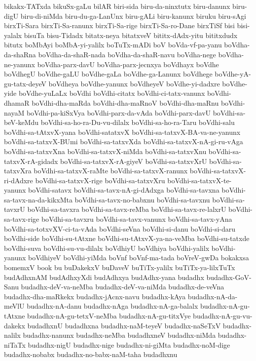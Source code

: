 {bikakx-TATxda
bikuSx-gaLu
bilAR
biri-sida
biru-da-ninxtutx
biru-danunx
biru-digU
biru-di-niMda
biru-du-ga-LanUnx
biru-gALi
biru-kanunx
biruku
biru-sAgi
birxTi-Sara
birxTi-Sa-ranunx
birxTi-Sa-rige
birxTi-Sa-ro-Dane
birxTiSf
bisi
bisi-yalalx
bisuTa
bisu-Tidadx
bitatx-neya
bitatxveV
bititx-dAdx-yitu
bititxdudx
bitutx
boMbAyi
boMbA-yi-yalilx
boTuTx-mADi
boV
boVda-vf-pa-yanu
boVdha-da-shaRna
boVdha-da-shaR-nada
boVdha-da-shaR-navu
boVdha-nege
boVdha-ne-yanunx
boVdha-parx-davU
boVdha-parx-jecnxya
boVdhayx
boVdhe
boVdhegU
boVdhe-gaLU
boVdhe-gaLa
boVdhe-ga-Lanunx
boVdhege
boVdhe-yA-gu-tatx-deyeV
boVdheya
boVdhe-yanunx
boVdheyeV
boVdhe-yi-dadxre
boVdhe-yide
boVdhe-yuLaLx
boVdhi
boVdhi-citatx
boVdhi-ci-tatx-vanunx
boVdhi-dhamaR
boVdhi-dha-maRda
boVdhi-dha-maRnoV
boVdhi-dha-maRnu
boVdhi-nayaM
boVdhi-pa-kiSxVya
boVdhi-parx-da-vAda
boVdhi-parx-davU
boVdhi-sa-beV-keMdu
boVdhi-sa-ho-ra-Du-vu-dilalx
boVdhi-sa-ho-ra-Taru
boVdhi-salu
boVdhi-sa-tAtxvX-yana
boVdhi-satatxvX
boVdhi-sa-tatxvX-BA-va-ne-yanunx
boVdhi-sa-tatxvX-BUmi
boVdhi-sa-tatxvXda
boVdhi-sa-tatxvX-nA-gi-ru-vAga
boVdhi-sa-tatxvXna
boVdhi-sa-tatxvX-niMda
boVdhi-sa-tatxvXnu
boVdhi-sa-tatxvX-rA-gidadx
boVdhi-sa-tatxvX-rA-giyeV
boVdhi-sa-tatxvXrU
boVdhi-sa-tatxvXra
boVdhi-sa-tatxvX-raMte
boVdhi-sa-tatxvX-ranunx
boVdhi-sa-tatxvX-ri-dAdxre
boVdhi-sa-tatxvX-rige
boVdhi-sa-tatxvXru
boVdhi-sa-tatxvX-te-yanunx
boVdhi-satavx
boVdhi-sa-tavx-nA-gi-dAdxga
boVdhi-sa-tavxna
boVdhi-sa-tavx-na-da-kikxMta
boVdhi-sa-tavx-no-babxnu
boVdhi-sa-tavxnu
boVdhi-sa-tavxrU
boVdhi-sa-tavxra
boVdhi-sa-tavx-reMba
boVdhi-sa-tavx-re-lalxrU
boVdhi-sa-tavx-rige
boVdhi-sa-tavxru
boVdhi-sa-tavx-vanunx
boVdhi-sa-tavx-yAna
boVdhi-sa-totxvXV-ci-ta-vAda
boVdhi-seVna
boVdhi-si-danu
boVdhi-si-daru
boVdhi-side
boVdhi-su-tAtxne
boVdhi-su-tAtxvX-ya-na-veMba
boVdhi-su-tatxde
boVdhi-suva
boVdhi-su-vu-dilalx
boVdhiyU
boVdhiya
boVdhi-yalilx
boVdhi-yanunx
boVdhiyeV
boVdhi-yiMda
boVnf
boVnf-ma-tada
boVreV-gwDa
bokakxsa
bomemxV
book
bu
buDakekxV
buDaveV
buTiTx-yalilx
buTiTx-ya-lilxTuTx
budAdhxnAM
budAdhxyXdi
budAdhxya
budAdhx-yana
budadhx
budadhx-GoV-Sanu
budadhx-deV-va-neMba
budadhx-deV-va-niMda
budadhx-de-veVna
budadhx-dha-maRkekx
budadhx-jAcnx-navu
budadhx-kAya
budadhx-nA-da-meVlU
budadhx-nA-danu
budadhx-nAga
budadhx-nA-ga-balalx
budadhx-nA-gu-tAtxne
budadhx-nA-gu-tetxV-neMba
budadhx-nA-gu-titxVye
budadhx-nA-gu-vu-dakekx
budadhxnU
budadhxna
budadhx-naM-teyeV
budadhx-naSeTxV
budadhx-nalilx
budadhx-nanunx
budadhx-neMba
budadhxneV
budadhx-niMda
budadhx-niTaTx
budadhx-nigU
budadhx-nige
budadhx-ni-giMta
budadhx-noM-dige
budadhx-nobabx
budadhx-no-babx-naM-taha
budadhxnu
}
